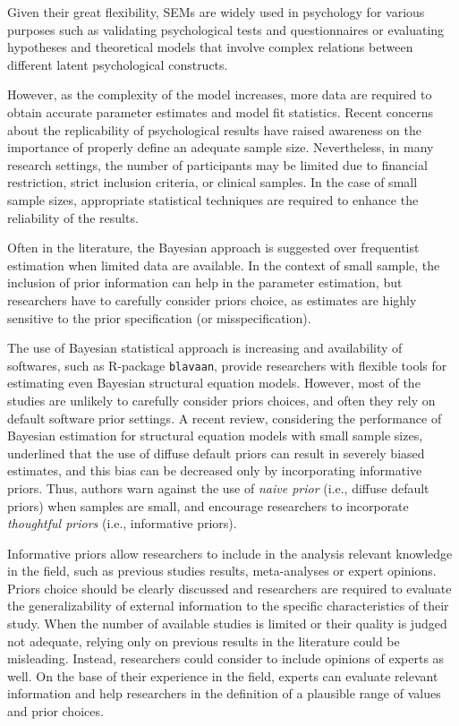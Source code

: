 \documentclass[graybox]{svmult}
\begin{document}
Given their great flexibility, SEMs are widely used in psychology for various purposes such as validating psychological tests and questionnaires or evaluating hypotheses and theoretical models that involve complex relations between different latent psychological constructs.

However, as the complexity of the model increases, more data are required to obtain accurate parameter estimates and model fit statistics. Recent concerns about the replicability of psychological results have raised awareness on the importance of properly define an adequate sample size.  Nevertheless, in many research settings, the number of participants may be limited due to financial restriction, strict inclusion criteria, or clinical samples. In the case of small sample sizes, appropriate statistical techniques are required to enhance the reliability of the results.

Often in the literature, the Bayesian approach is suggested over frequentist estimation when limited data are available.  In the context of small sample, the inclusion of prior information can help in the parameter estimation, but researchers have to carefully consider priors choice, as estimates are highly sensitive to the prior specification (or misspecification).

The use of Bayesian statistical approach is increasing and availability of softwares, such as R-package \texttt{blavaan},  provide researchers with flexible tools for estimating even Bayesian structural equation models. However, most of the studies are unlikely to carefully consider priors choices, and often they rely on default software prior settings. A recent review, considering the performance of Bayesian estimation for structural equation models with small sample sizes, underlined that the use of diffuse default priors can result in severely biased estimates, and this bias can be decreased only by incorporating informative priors. Thus, authors warn against the use of \emph{naive prior} (i.e., diffuse default priors) when samples are small, and encourage researchers to incorporate \emph{thoughtful priors} (i.e., informative priors).

Informative priors allow researchers to include in the analysis relevant knowledge in the field, such as previous studies results, meta-analyses or expert opinions. Priors choice should be clearly discussed and researchers are required to evaluate the generalizability of external information to the specific characteristics of their study. When the number of available studies is limited or their quality is judged not adequate, relying only on previous results in the literature could be misleading. Instead, researchers could consider to include opinions of experts as well. On the base of their experience in the field, experts can evaluate relevant information and help researchers in the definition of a plausible range of values and prior choices.
\end{document}
